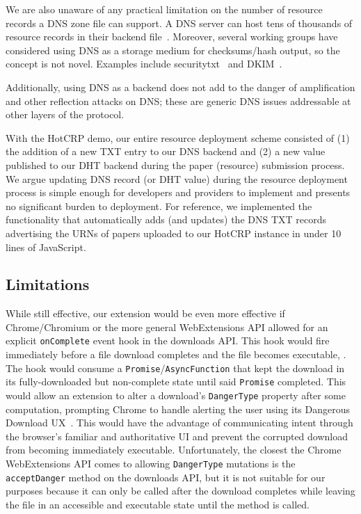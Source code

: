 We are also unaware of any practical limitation on the number of resource
records a DNS zone file can support. A DNS server can host tens of thousands of
resource records in their backend file~\cite{DNS1, DNS2}. Moreover, several
working groups have considered using DNS as a storage medium for checksums/hash
output, so the concept is not novel. Examples include
securitytxt~\cite{draft-sectxt} and DKIM~\cite{DKIM}.

Additionally, using DNS as a backend does not add to the danger of amplification
and other reflection attacks on DNS; these are generic DNS issues addressable at
other layers of the protocol.

With the HotCRP demo, our entire resource deployment scheme consisted of (1) the
addition of a new TXT entry to our DNS backend and (2) a new value published to
our DHT backend during the paper (resource) submission process. We argue
updating DNS record (or DHT value) during the resource deployment process is
simple enough for developers and providers to implement and presents no
significant burden to deployment. For reference, we implemented the
functionality that automatically adds (and updates) the DNS TXT records
advertising the URNs of papers uploaded to our HotCRP instance in under 10 lines
of JavaScript.

\subsection{Limitations}

While still effective, our extension would be even more effective if
Chrome/Chromium or the more general WebExtensions API allowed for an explicit
\texttt{onComplete} event hook in the downloads API. This hook would fire
immediately before a file download completes and the file becomes executable,
. The
hook would consume a \texttt{Promise}/\texttt{AsyncFunction} that kept the
download in its fully-downloaded but non-complete state until said
\texttt{Promise} completed. This would allow an extension to alter a download's
\texttt{DangerType} property after some computation, prompting Chrome to handle
alerting the user using its Dangerous Download UX~\cite{ChromeClickThrough}.
This would have the advantage of communicating intent through the browser's
familiar and authoritative UI and prevent the corrupted download from becoming
immediately executable. Unfortunately, the closest the Chrome WebExtensions API
comes to allowing \texttt{DangerType} mutations is the \texttt{acceptDanger}
method on the downloads API, but it is not suitable for our purposes because it
can only be called after the download completes while leaving the file in an
accessible and executable state until the method is called.


